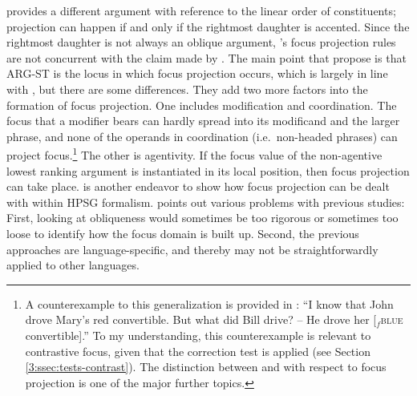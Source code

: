 



\noindent \citet{dekuthy:00} provides a different argument with
reference to the linear order of constituents;  projection
can happen if and only if the rightmost daughter is accented. Since
the rightmost daughter is not always an oblique argument, \citeauthor{dekuthy:00}'s focus projection rules are not
concurrent with the claim made by \citeauthor{engdahl:vallduvi:96}.
The main point that \citet{chung:etal:03} propose is that ARG-ST is
the locus in which focus projection occurs, which is largely in line
with \citeauthor{engdahl:vallduvi:96}, but there are some differences.
They add two more factors into the formation of focus projection.  One
includes modification and coordination. The focus that a modifier
bears can hardly spread into its modificand and the larger phrase, and
none of the operands in coordination (i.e.\ non-headed phrases) can
project focus.\footnote{A counterexample to this generalization is
  provided in \citet[326f.]{buring:06}: ``I know that John drove
  Mary's red convertible. But what did Bill drive? -- He drove her
  [$_{f}$\textsc{blue} convertible].''  To my understanding, this
  counterexample is relevant to contrastive focus, given that the
  correction test is applied (see Section
  \ref{3:ssec:tests-contrast}). The distinction between
   and  with respect
  to focus projection is one of the major further topics.}  The other
is agentivity. If the focus value of the non-agentive lowest ranking
argument is instantiated in its local position, then focus projection
can take place. \citet{bildhauer:07} is another endeavor to show how
focus projection can be dealt with within HPSG formalism.
\citeauthor{bildhauer:07} points out various problems with previous
studies: First, looking at obliqueness would sometimes be too rigorous
or sometimes too loose to identify how the focus domain is built
up. Second, the previous approaches are language-specific, and thereby
may not be straightforwardly applied to other languages.




